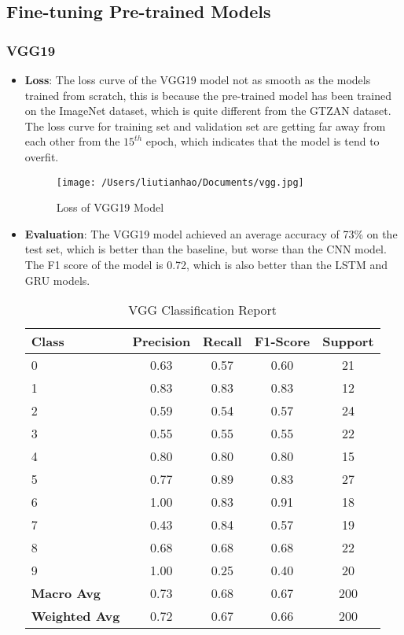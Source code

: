 \documentclass{article}
\begin{document}
\subsection{Fine-tuning Pre-trained Models}
\subsubsection{VGG19}
\begin{itemize}
  \item \textbf{Loss}: The loss curve of the VGG19 model not as smooth as the models trained from scratch, this is because the pre-trained model has been trained on the ImageNet dataset, which is quite different from the GTZAN dataset.
  The loss curve for training set and validation set are getting far away from each other from the $15^{th}$ epoch, which indicates that the model is tend to overfit.
  \begin{figure}[h!]
    \centering
    \texttt{[image: /Users/liutianhao/Documents/vgg.jpg]}
    \caption{Loss of VGG19 Model}
  \end{figure}
  \item \textbf{Evaluation}: 
  The VGG19 model achieved an average accuracy of 73\% on the test set, which is better than the baseline, but worse than the CNN model.
  The F1 score of the model is 0.72, which is also better than the LSTM and GRU models.
  \begin{table}[h]
    \centering
    \caption{VGG Classification Report}
    \begin{tabular}{lcccc}
        \toprule
        Class & Precision & Recall & F1-Score & Support \\
        \midrule
        0 & 0.63 & 0.57 & 0.60 & 21 \\
        1 & 0.83 & 0.83 & 0.83 & 12 \\
        2 & 0.59 & 0.54 & 0.57 & 24 \\
        3 & 0.55 & 0.55 & 0.55 & 22 \\
        4 & 0.80 & 0.80 & 0.80 & 15 \\
        5 & 0.77 & 0.89 & 0.83 & 27 \\
        6 & 1.00 & 0.83 & 0.91 & 18 \\
        7 & 0.43 & 0.84 & 0.57 & 19 \\
        8 & 0.68 & 0.68 & 0.68 & 22 \\
        9 & 1.00 & 0.25 & 0.40 & 20 \\
        \midrule
        
        \textbf{Macro Avg} & 0.73 & 0.68 & 0.67 & 200 \\
        \textbf{Weighted Avg} & 0.72 & 0.67 & 0.66 & 200 \\
        \bottomrule
    \end{tabular}
\end{table}
\end{itemize}
\end{document}
